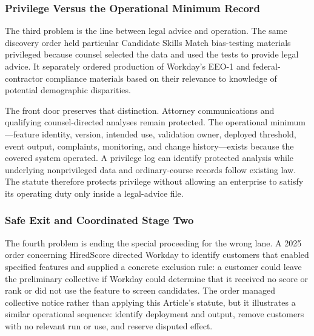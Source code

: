 \subsubsection{Privilege Versus the Operational Minimum Record}
\label{sec:mobley-privilege}

The third problem is the line between legal advice and operation. The same discovery order held particular Candidate Skills Match bias-testing materials privileged because counsel selected the data and used the tests to provide legal advice. It separately ordered production of Workday's EEO-1 and federal-contractor compliance materials based on their relevance to knowledge of potential demographic disparities.

The front door preserves that distinction. Attorney communications and qualifying counsel-directed analyses remain protected. The operational minimum---feature identity, version, intended use, validation owner, deployed threshold, event output, complaints, monitoring, and change history---exists because the covered system operated. A privilege log can identify protected analysis while underlying nonprivileged data and ordinary-course records follow existing law. The statute therefore protects privilege without allowing an enterprise to satisfy its operating duty only inside a legal-advice file.

\subsubsection{Safe Exit and Coordinated Stage Two}

The fourth problem is ending the special proceeding for the wrong lane. A 2025 order concerning HiredScore directed Workday to identify customers that enabled specified features and supplied a concrete exclusion rule: a customer could leave the preliminary collective if Workday could determine that it received no score or rank or did not use the feature to screen candidates. The order managed collective notice rather than applying this Article's statute, but it illustrates a similar operational sequence: identify deployment and output, remove customers with no relevant run or use, and reserve disputed effect.

